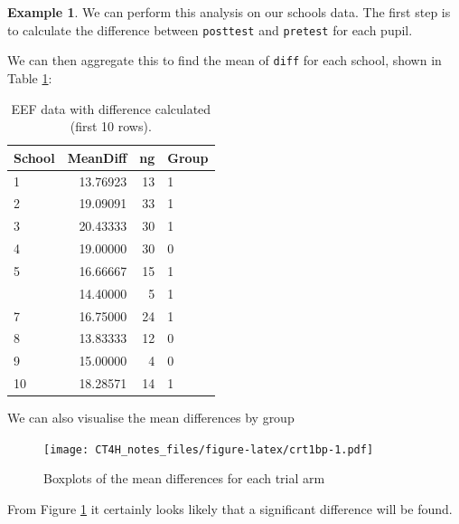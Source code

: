 \documentclass[
  openany]{book}
\newenvironment{Shaded}{\begin{snugshade}}{\end{snugshade}}
\newcommand{\NormalTok}[1]{#1}
\newcommand{\OtherTok}[1]{\textcolor[rgb]{0.56,0.35,0.01}{#1}}
\newcommand{\SpecialCharTok}[1]{\textcolor[rgb]{0.81,0.36,0.00}{\textbf{#1}}}
\theoremstyle{definition}
\theoremstyle{definition}
\newtheorem{example}{Example}[chapter]
\theoremstyle{definition}
\theoremstyle{definition}
\theoremstyle{remark}
\begin{document}
\begin{example}

We can perform this analysis on our schools data. The first step is to calculate the difference between \texttt{posttest} and \texttt{pretest} for each pupil.

\begin{Shaded}
\end{Shaded}

We can then aggregate this to find the mean of \texttt{diff} for each school, shown in Table \ref{tab:eefsum}:

\begin{table}

\caption{\label{tab:eefsum}EEF data with difference calculated (first 10 rows).}
\centering
\begin{tabular}[t]{lrrl}
\toprule
School & MeanDiff & ng & Group\\
\midrule
1 & 13.76923 & 13 & 1\\
2 & 19.09091 & 33 & 1\\
3 & 20.43333 & 30 & 1\\
4 & 19.00000 & 30 & 0\\
5 & 16.66667 & 15 & 1\\
\addlinespace
6 & 14.40000 & 5 & 1\\
7 & 16.75000 & 24 & 1\\
8 & 13.83333 & 12 & 0\\
9 & 15.00000 & 4 & 0\\
10 & 18.28571 & 14 & 1\\
\bottomrule
\end{tabular}
\end{table}

We can also visualise the mean differences by group

\begin{figure}
\centering
\texttt{[image: CT4H\_notes\_files/figure-latex/crt1bp-1.pdf]}
\caption{\label{fig:crt1bp}Boxplots of the mean differences for each trial arm}
\end{figure}

From Figure \ref{fig:crt1bp} it certainly looks likely that a significant difference will be found.


\end{example}
\end{document}
